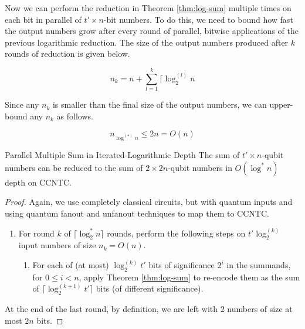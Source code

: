 Now we can perform the reduction in Theorem \ref{thm:log-sum} multiple times
on each bit in parallel of $t' \times n$-bit numbers. To do this, we need
to bound how fast the output numbers grow after every round of parallel,
bitwise applications of the previous logarithmic reduction. The size of
the output numbers produced after $k$ rounds of reduction is given below.

\begin{equation}
n_k = n + \sum_{l=1}^k \lceil \log_2^{(l)}n
\end{equation}

Since any $n_k$ is smaller than the final size of the output numbers,
we can upper-bound any $n_k$ as follows.

\begin{equation}
n_{\log^{(*)}n} \le 2n = O(n)
\end{equation}

\begin{theorem}{Parallel Multiple Sum in Iterated-Logarithmic Depth}
The sum of $t' \times n$-qubit numbers can be reduced to the sum
of $2 \times 2n$-qubit numbers in $O(\log^{*}n)$ depth on CCNTC.
\end{theorem}

\begin{proof}
Again, we use completely classical circuits, but with quantum inputs and
using quantum fanout and unfanout techniques to map them to CCNTC.

\begin{enumerate}

\item For round $k$ of $\lceil \log_2^{*} n \rceil$ rounds, perform the following
steps on $t'\log_2^{(k)}$ input numbers of size $n_k = O(n)$. 

\begin{enumerate}

\item
For each of (at most) $\log_2^{(k)}t'$ bits of significance $2^i$ in the summands, for 
$0 \le i < n$, apply Theorem \ref{thm:log-sum} to re-encode them as the sum of
$\lceil \log_2^{(k+1)}t' \rceil$ bits (of different significance). 

\end{enumerate}

\end{enumerate}

At the end of the last round, by definition, we are left with $2$ numbers of size
at most $2n$ bits.
\end{proof}